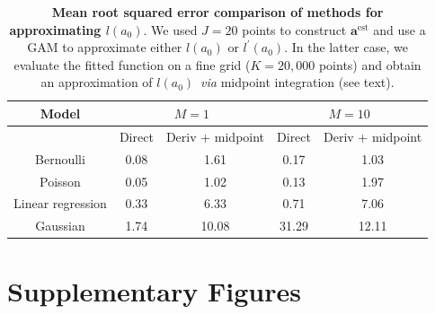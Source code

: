 \documentclass[a4paper, notitlepage, 11pt]{article}
\begin{document}
\begin{table}[!ht]
\caption{\textbf{ Mean root squared error comparison of methods for approximating $l(a_0)$}.
We used $J = 20$ points to construct $\boldsymbol a^{\text{est}}$ and use a GAM to approximate either $l(a_0)$ or $l^\prime(a_0)$. 
In the latter case, we evaluate the fitted function on a fine grid ($K = 20, 000$ points) and obtain an approximation of $l(a_0)$~\textit{via} midpoint integration (see text).
}
\begin{center}
\label{tab:rmse_approx}
\begin{tabular}{ccccc}
\hline
        Model          & \multicolumn{2}{c}{$M = 1$} & \multicolumn{2}{c}{$M = 10$} \\
\hline
                  & Direct & Deriv + midpoint & Direct  & Deriv + midpoint \\
Bernoulli         & 0.08   & 1.61             & 0.17    & 1.03             \\
Poisson           & 0.05   & 1.02             & 0.13    & 1.97             \\
Linear regression & 0.33   & 6.33             & 0.71    & 7.06             \\
Gaussian          & 1.74   & 10.08            & 31.29   & 12.11           \\
\hline
\end{tabular} 
\end{center}
\end{table}

\newpage

\section{Supplementary Figures}
\label{sec:extra_figs}
\end{document}
